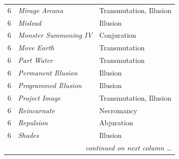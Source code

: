\begin{multicols}{2}
\begin{tabular}{|p{}|p{}|p{}|}
6	& \textit{Mirage Arcana}	& Transmutation, Illusion \\
\rowcolor[gray]{.9}6	& \textit{Mislead}	& Illusion \\
6	& \textit{Monster Summoning IV}	& Conjuration \\
\rowcolor[gray]{.9}6	& \textit{Move Earth}	& Transmutation \\
6	& \textit{Part Water}	& Transmutation \\
\rowcolor[gray]{.9}6	& \textit{Permanent Illusion}	& Illusion \\
6	& \textit{Programmed Illusion}	& Illusion \\
\rowcolor[gray]{.9}6	& \textit{Project Image}	& Transmutation, Illusion \\
6	& \textit{Reincarnate}	& Necromancy \\
\rowcolor[gray]{.9}6	& \textit{Repulsion}	& Abjuration \\
6	& \textit{Shades}	& Illusion \\
\hline
\multicolumn{3}{r}{\textit{continued on next column \ldots}} \\
\end{tabular}


\end{multicols}
